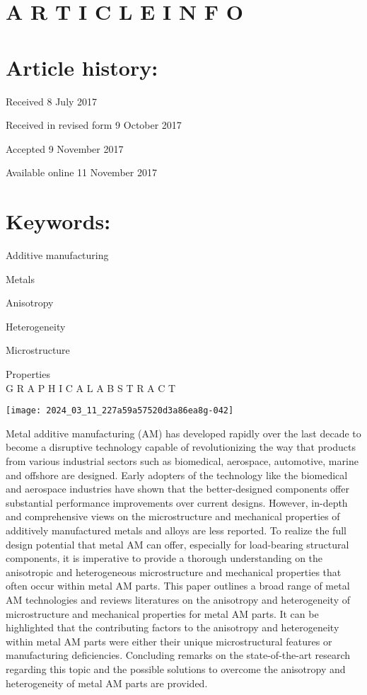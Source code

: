 \documentclass[10pt]{article}
\begin{document}
\section*{A R T I C L E I N F O}
\section*{Article history:}
Received 8 July 2017

Received in revised form 9 October 2017

Accepted 9 November 2017

Available online 11 November 2017

\section*{Keywords:}
Additive manufacturing

Metals

Anisotropy

Heterogeneity

Microstructure

Properties\\
G R A P H I C A L A B S T R A C T

\begin{center}
\texttt{[image: 2024\_03\_11\_227a59a57520d3a86ea8g-042]}
\end{center}

Metal additive manufacturing (AM) has developed rapidly over the last decade to become a disruptive technology capable of revolutionizing the way that products from various industrial sectors such as biomedical, aerospace, automotive, marine and offshore are designed. Early adopters of the technology like the biomedical and aerospace industries have shown that the better-designed components offer substantial performance improvements over current designs. However, in-depth and comprehensive views on the microstructure and mechanical properties of additively manufactured metals and alloys are less reported. To realize the full design potential that metal AM can offer, especially for load-bearing structural components, it is imperative to provide a thorough understanding on the anisotropic and heterogeneous microstructure and mechanical properties that often occur within metal AM parts. This paper outlines a broad range of metal AM technologies and reviews literatures on the anisotropy and heterogeneity of microstructure and mechanical properties for metal AM parts. It can be highlighted that the contributing factors to the anisotropy and heterogeneity within metal AM parts were either their unique microstructural features or manufacturing deficiencies. Concluding remarks on the state-of-the-art research regarding this topic and the possible solutions to overcome the anisotropy and heterogeneity of metal AM parts are provided.
\end{document}
